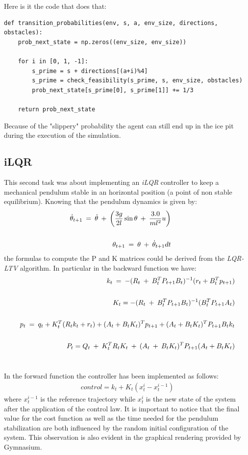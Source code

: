 \documentclass[10pt,a4paper]{article}
\begin{document}
\noindent Here is it the code that does that:
\begin{lstlisting}
def transition_probabilities(env, s, a, env_size, directions, obstacles):
    prob_next_state = np.zeros((env_size, env_size))

    for i in [0, 1, -1]:
        s_prime = s + directions[(a+i)%4]
        s_prime = check_feasibility(s_prime, s, env_size, obstacles)
        prob_next_state[s_prime[0], s_prime[1]] += 1/3 
        
    return prob_next_state
\end{lstlisting}
Because of the "slippery" probability the agent can still end up in the ice pit during the execution of the simulation.
\newpage

\subsection{iLQR}
This second task was about implementing an \textit{iLQR} controller to keep a mechanical pendulum stable in an horizontal position (a point of non stable equilibrium). Knowing that the pendulum dynamics is given by:
\begin{align}
    \dot{\theta}_{t+1} \:=\: \dot{\theta} \:+\: \left( \frac{3g}{2l} \sin{\theta} \:+\: \frac{3.0}{ml^{2}}u\right) \\
    && && \notag  \\
    \theta_{t+1} \:=\: \theta \:+\: \dot{\theta}_{t+1} dt
\end{align}
\vspace{2pt}
the formulas to compute the P and K matrices could be derived from the \textit{LQR-LTV} algorithm. In particular in the backward function we have: 
\begin{align}
    k_t \:=\: -(R_t \:+\: B_{t}^{T} P_{t+1} B_{t})^{-1}  (r_{t} + B_{t}^{T} p_{t+1}) \\
    \notag  \\
    K_t = -(R_t \:+\: B_{t}^{T}  P_{t+1} B_t)^{-1} (B_{t}^{T} P_{t+1} A_t) \\
    \notag  \\
    p_t \:=\: q_t +K_{t}^{T} (R_{t} k_t +r_t) + (A_t + B_t K_t)^{T} p_{t+1} + (A_t + B_t K_t)^{T} P_{t+1} B_{t} k_t \\
   \notag  \\
    P_t = Q_{t} \:+\: K_{t}^{T} R_{t} K_{t} \:+\: (A_t \:+\: B_t K_t)^{T} P_{t+1} (A_t + B_t K_t)
\end{align}\\
\vspace{5pt}

\noindent In the forward function the controller has been implemented as follows:
\begin{align}
    control = k_{t} + K_{t} (x_{t}^{i} - x_{t}^{i-1})
\end{align}
where $x_{t}^{i-1}$ is the reference trajectory while $x_{t}^{i}$ is the new state of the system after the application of the control law. It is important to notice that the final value for the cost function as well as the time needed for the pendulum stabilization are both influenced by the random initial configuration of the system. This observation is also evident in the graphical rendering provided by Gymnasium.
\end{document}
